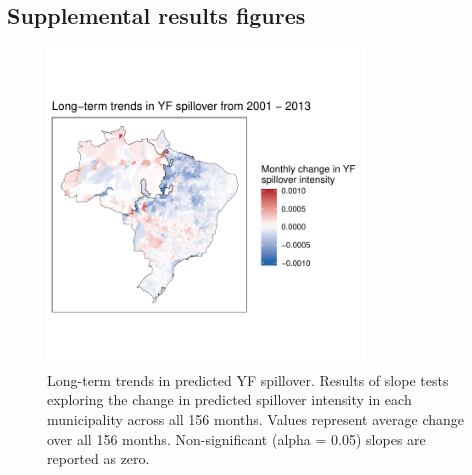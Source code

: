 \documentclass{article}
\begin{document}
\subsection*{Supplemental results figures}

\begin{figure}
\centering
\includegraphics[width=0.75\textwidth]{trendsAcrossSpace_156months}
\caption{Long-term trends in predicted YF spillover. Results of slope tests exploring the change in predicted spillover intensity in each municipality across all 156 months. Values represent average change over all 156 months. Non-significant (alpha = 0.05) slopes are reported as zero.}
\label{}
\end{figure}
\end{document}
